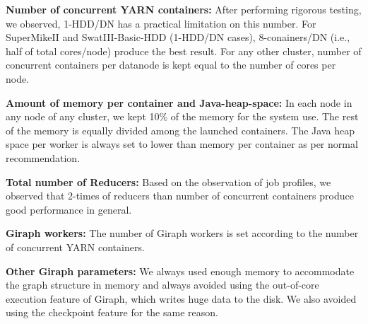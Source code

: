 \documentclass[conference]{IEEEtran}
\begin{document}
\textbf{Number of concurrent YARN containers:} After performing rigorous testing,  we observed, 1-HDD/DN has a practical limitation on this number. For SuperMikeII and SwatIII-Basic-HDD (1-HDD/DN cases), 8-conainers/DN (i.e., half of total cores/node) produce the best result. For any other cluster, number of concurrent containers per datanode is kept equal to the number of cores per node. 

\textbf{Amount of memory per container and Java-heap-space:} In each node in any node of any cluster, we kept 10\% of the memory for the system use. The rest of the memory is equally divided among the launched containers. The Java heap space per worker is always set to lower than memory per container as per normal recommendation.

\textbf{Total number of Reducers:} Based on the observation of job profiles, we observed that 2-times of reducers than number of concurrent containers produce good performance in general. 

\textbf{Giraph workers:} The number of Giraph workers is set according to the number of concurrent YARN containers.

\textbf{Other Giraph parameters:} We always used enough memory to accommodate the graph structure in memory and always avoided using the out-of-core execution feature of Giraph, which writes huge data to the disk. We also avoided using the checkpoint feature for the same reason.
\end{document}
